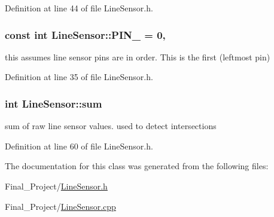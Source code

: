 Definition at line 44 of file Line\-Sensor.\-h.

\hypertarget{classLineSensor_a873c5b45cdfa14ff468db018e1e0055a}{
\subsubsection[{P\-I\-N\-\_\-0}]{\setlength{\rightskip}{0pt plus 5cm}const int Line\-Sensor\-::\-P\-I\-N\-\_ = 0\hspace{0.3cm}{\ttfamily [static]}, {\ttfamily [private]}}}\label{classLineSensor_a873c5b45cdfa14ff468db018e1e0055a}


this assumes line sensor pins are in order. This is the first (leftmost pin) 



Definition at line 35 of file Line\-Sensor.\-h.

\hypertarget{classLineSensor_af574319adc88f5949f03239b2bcbc222}{
\subsubsection[{sum}]{\setlength{\rightskip}{0pt plus 5cm}int Line\-Sensor\-::sum\hspace{0.3cm}{\ttfamily [private]}}}\label{classLineSensor_af574319adc88f5949f03239b2bcbc222}


sum of raw line sensor values. used to detect intersections 



Definition at line 60 of file Line\-Sensor.\-h.



The documentation for this class was generated from the following files\-:\begin{DoxyCompactItemize}
\item 
Final\-\_\-\-Project/\hyperlink{LineSensor_8h}{Line\-Sensor.\-h}\item 
Final\-\_\-\-Project/\hyperlink{LineSensor_8cpp}{Line\-Sensor.\-cpp}\end{DoxyCompactItemize}
